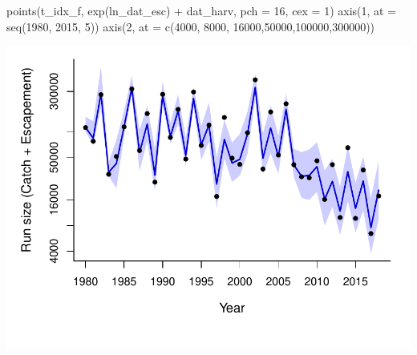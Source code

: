 \documentclass[11pt,]{article}
\newenvironment{Shaded}{}{}
\newcommand{\KeywordTok}[1]{\textcolor[rgb]{0.00,0.00,1.00}{#1}}
\newcommand{\DataTypeTok}[1]{#1}
\newcommand{\DecValTok}[1]{#1}
\newcommand{\StringTok}[1]{\textcolor[rgb]{0.00,0.50,0.50}{#1}}
\newcommand{\OperatorTok}[1]{#1}
\newcommand{\NormalTok}[1]{#1}
\begin{document}
\begin{Shaded}
\begin{Highlighting}[]
\KeywordTok{points}\NormalTok{(t_idx_f, }\KeywordTok{exp}\NormalTok{(ln_dat_esc) }\OperatorTok{+}\StringTok{ }\NormalTok{dat_harv, }\DataTypeTok{pch =} \DecValTok{16}\NormalTok{, }\DataTypeTok{cex =} \DecValTok{1}\NormalTok{)}
\KeywordTok{axis}\NormalTok{(}\DecValTok{1}\NormalTok{, }\DataTypeTok{at =} \KeywordTok{seq}\NormalTok{(}\DecValTok{1980}\NormalTok{, }\DecValTok{2015}\NormalTok{, }\DecValTok{5}\NormalTok{))}
\KeywordTok{axis}\NormalTok{(}\DecValTok{2}\NormalTok{, }\DataTypeTok{at =} \KeywordTok{c}\NormalTok{(}\DecValTok{4000}\NormalTok{, }\DecValTok{8000}\NormalTok{, }\DecValTok{16000}\NormalTok{,}\DecValTok{50000}\NormalTok{,}\DecValTok{100000}\NormalTok{,}\DecValTok{300000}\NormalTok{))}
\end{Highlighting}
\end{Shaded}

\begin{center}\includegraphics{App_3_Summarize_results_files/figure-latex/fig_2_run_size-1} \end{center}
\end{document}
